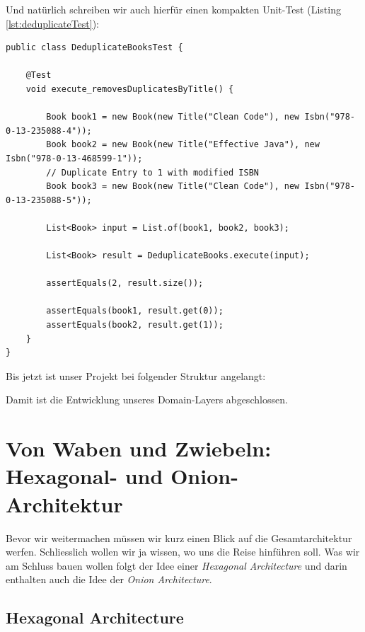 Und natürlich schreiben wir auch hierfür einen kompakten Unit-Test 
(Listing \ref{lst:deduplicateTest}):

\begin{listing}[H]
\begin{verbatim}
public class DeduplicateBooksTest {

    @Test
    void execute_removesDuplicatesByTitle() {

        Book book1 = new Book(new Title("Clean Code"), new Isbn("978-0-13-235088-4"));
        Book book2 = new Book(new Title("Effective Java"), new Isbn("978-0-13-468599-1"));
        // Duplicate Entry to 1 with modified ISBN
        Book book3 = new Book(new Title("Clean Code"), new Isbn("978-0-13-235088-5"));

        List<Book> input = List.of(book1, book2, book3);

        List<Book> result = DeduplicateBooks.execute(input);

        assertEquals(2, result.size());

        assertEquals(book1, result.get(0));
        assertEquals(book2, result.get(1));
    }
}
\end{verbatim}
\caption{Unit-Test für den Deduplicate-Service}
\label{lst:deduplicateTest}
\end{listing}

Bis jetzt ist unser Projekt bei folgender Struktur angelangt:


%

Damit ist die Entwicklung unseres Domain-Layers abgeschlossen.

\section{Von Waben und Zwiebeln: Hexagonal- und Onion- Architektur}
Bevor wir weitermachen müssen wir kurz einen Blick auf die Gesamtarchitektur
werfen. Schliesslich wollen wir ja wissen, wo uns die Reise hinführen soll.
Was wir am Schluss bauen wollen folgt der Idee einer 
\textit{Hexagonal Architecture} und darin enthalten auch die Idee der
\textit{Onion Architecture}.

\subsection{Hexagonal Architecture}

